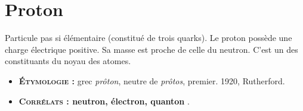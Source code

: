 \section{Proton}
Particule pas si élémentaire (constitué de trois quarks).
Le proton possède une charge électrique positive.
Sa masse est proche de celle du neutron.
C'est un des constituants du noyau des atomes.
{\footnotesize
\begin{itemize}[leftmargin=1cm, label=, itemsep=1pt]
\item {\bf \textsc{Étymologie} :} grec {\it prôton}, neutre de {\it prôtos}, premier. 1920, Rutherford.
\item {\bf \textsc{Corrélats} : neutron, électron, quanton} .
\end{itemize}
}
